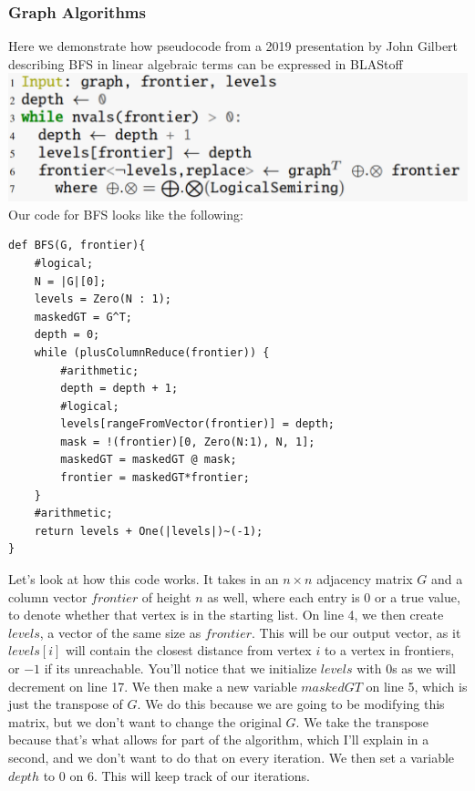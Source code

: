 \subsubsection{Graph Algorithms}
Here we demonstrate how pseudocode from a 2019 presentation by John Gilbert describing BFS in linear algebraic terms \cite{Gilbert} can be expressed in BLAStoff\\
\includegraphics[scale=0.4]{figures/pseudocode}\\
Our code for BFS looks like the following:
\begin{lstlisting}
def BFS(G, frontier){
    #logical;
    N = |G|[0];
    levels = Zero(N : 1);
    maskedGT = G^T;
    depth = 0;
    while (plusColumnReduce(frontier)) {
        #arithmetic;
        depth = depth + 1;
        #logical;
        levels[rangeFromVector(frontier)] = depth;
        mask = !(frontier)[0, Zero(N:1), N, 1];
        maskedGT = maskedGT @ mask;
        frontier = maskedGT*frontier;
    }
    #arithmetic;
    return levels + One(|levels|)~(-1);
}
\end{lstlisting}
Let's look at how this code works.  It takes in an $n\times n$ adjacency matrix $G$ and a column vector $frontier$ of height $n$ as well, where each entry is 0 or a true value, to denote whether that vertex is in the starting list.  On line 4, we then create $levels$, a vector of the same size as $frontier$.  This will be our output vector, as it $levels[i]$ will contain the closest distance from vertex $i$ to a vertex in frontiers, or $-1$ if its unreachable.   You'll notice that we initialize $levels$ with 0s as we will decrement on line 17.  We then make a new variable $maskedGT$ on line 5, which is just the transpose of $G$.  We do this because we are going to be modifying this matrix, but we don't want to change the original $G$.  We take the transpose because that's what allows for part of the algorithm, which I'll explain in a second, and we don't want to do that on every iteration. We then set a variable $depth$ to 0 on 6.  This will keep track of our iterations.


